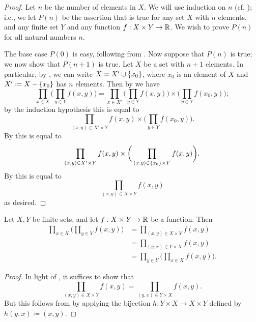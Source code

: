 \begin{proof}
  Let \(n\) be the number of elements in \(X\).
  We will use induction on \(n\) (cf. );
  i.e., we let \(P(n)\) be the assertion that  is true for any set \(X\) with \(n\) elements, and any finite set \(Y\) and any function \(f : X \times Y \to \mathbb{R}\).
  We wish to prove \(P(n)\) for all natural numbers \(n\).

  The base case \(P(0)\) is easy, following from .
  Now suppose that \(P(n)\) is true;
  we now show that \(P(n + 1)\) is true.
  Let \(X\) be a set with \(n + 1\) elements.
  In particular, by , we can write \(X = X' \cup \left\lbrace x_0\right\rbrace\), where \(x_0\) is an element of \(X\) and \(X' \coloneqq X - \left\lbrace x_0\right\rbrace\) has \(n\) elements.
  Then by  we have
  \[
    \prod_{x \in X} \bigg(\prod_{y \in Y} f(x, y)\bigg) = \prod_{x \in X'} \bigg(\prod_{y \in Y} f(x, y)\bigg) \times \bigg(\prod_{y \in Y} f(x_0, y)\bigg);
  \]
  by the induction hypothesis this is equal to
  \[
    \prod_{(x, y) \in X' \times Y} f(x, y) \times \bigg(\prod_{y \in Y} f(x_0, y)\bigg).
  \]
  By  this is equal to
  \[
    \prod_{(x, y) \in X' \times Y} f(x, y) \times \bigg(\prod_{(x, y) \in \left\lbrace x_0\right\rbrace \times Y} f(x, y)\bigg).
  \]
  By  this is equal to
  \[
    \prod_{(x, y) \in X \times Y} f(x, y)
  \]
  as desired.
\end{proof}

\begin{ac}\label{i:ac:7.1.7}
  Let \(X, Y\) be finite sets, and let \(f : X \times Y \to \mathbb{R}\) be a function.
  Then
  \begin{align*}
    \prod_{x \in X} \bigg(\prod_{y \in Y} f(x, y)\bigg) & = \prod_{(x, y) \in X \times Y} f(x, y)                \\
                                                        & = \prod_{(y, x) \in Y \times X} f(x, y)                \\
                                                        & = \prod_{y \in Y} \bigg(\prod_{x \in X} f(x, y)\bigg).
  \end{align*}
\end{ac}

\begin{proof}
  In light of , it suffices to show that
  \[
    \prod_{(x, y) \in X \times Y} f(x, y) = \prod_{(y, x) \in Y \times X} f(x, y).
  \]
  But this follows from  by applying the bijection \(h : Y \times X \to X \times Y\) defined by \(h(y, x) \coloneqq (x, y)\).
\end{proof}

